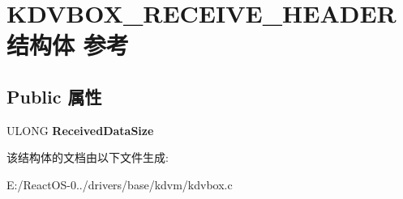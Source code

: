 \hypertarget{struct_k_d_v_b_o_x___r_e_c_e_i_v_e___h_e_a_d_e_r}{}\section{K\+D\+V\+B\+O\+X\+\_\+\+R\+E\+C\+E\+I\+V\+E\+\_\+\+H\+E\+A\+D\+E\+R结构体 参考}
\label{struct_k_d_v_b_o_x___r_e_c_e_i_v_e___h_e_a_d_e_r}
\subsection*{Public 属性}
\begin{DoxyCompactItemize}
\item 
\mbox{\label{struct_k_d_v_b_o_x___r_e_c_e_i_v_e___h_e_a_d_e_r_ac6669a058f12bb4956851ead9fc081d9}} 
U\+L\+O\+NG {\bfseries Received\+Data\+Size}
\end{DoxyCompactItemize}


该结构体的文档由以下文件生成\+:\begin{DoxyCompactItemize}
\item 
E\+:/\+React\+O\+S-\/0../drivers/base/kdvm/kdvbox.\+c\end{DoxyCompactItemize}
